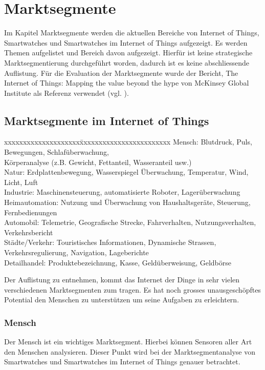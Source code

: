 \chapter{Marktsegmente}
Im Kapitel Marktsegmente werden die aktuellen Bereiche von Internet of Things, Smartwatches und Smartwatches im Internet of Things aufgezeigt. Es werden Themen aufgelistet und Bereich davon aufgezeigt. Hierfür ist keine strategische Marktsegmentierung durchgeführt worden, dadurch ist es keine abschliessende Auflistung. Für die Evaluation der Marktsegmente wurde der Bericht, The Internet of Things:
Mapping the value beyond the hype von McKinsey Global Institute als Referenz verwendet (vgl. \cite{mk:iot}).

\section{Marktsegmente im Internet of Things}
\begin{tabbing}
xxxxxxxxxxxxxxxxxxxx\=xxxxxxxxxxxxxxxxxxxxxxxx	\kill
Mensch:          \>  Blutdruck, Puls, Bewegungen, Schlafüberwachung, \\\>Körperanalyse {(z.B. Gewicht, Fettanteil, Wasseranteil usw.)} \\
Natur:			     \>  Erdplattenbewegung, Wasserspiegel Überwachung, Temperatur, Wind, Licht, Luft \\
Industrie:  		 \>  Maschinensteuerung, automatisierte Roboter, Lagerüberwachung \\
Heimautomation:	 \>  Nutzung und Überwachung von Haushaltsgeräte, Steuerung, Fernbedienungen \\
Automobil: 		   \>  Telemetrie, Geografische Strecke, Fahrverhalten, Nutzungsverhalten, Verkehrsbericht \\
Städte{/}Verkehr:\>  Touristisches Informationen, Dynamische Strassen, Verkehrsregulierung, Navigation, Lageberichte \\
Detailhandel:		 \>  Produktebezeichnung, Kasse, Geldüberweisung, Geldbörse
\end{tabbing}
Der Auflistung zu entnehmen, kommt das Internet der Dinge in sehr vielen verschiedenen Marktsegmenten zum tragen. Es hat noch grosses unausgeschöpftes Potential den Menschen zu unterstützen um seine Aufgaben zu erleichtern.
\subsection{Mensch}
Der Mensch ist ein wichtiges Marktsegment. Hierbei können Sensoren aller Art den Menschen analysieren. Dieser Punkt wird bei der Marktsegmentanalyse von Smartwatches und Smartwatches im Internet of Things genauer betrachtet.

